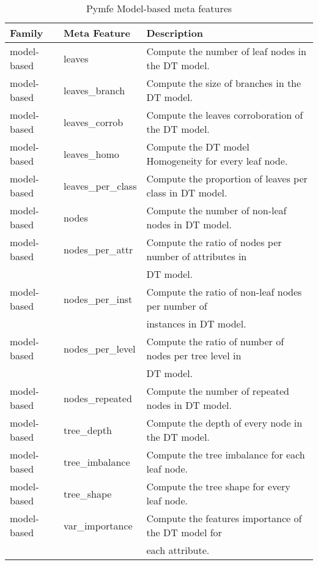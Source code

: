 \begin{table}[h!]
  \centering
  \caption{Pymfe Model-based meta features}
  \setlength{\tabcolsep}{8pt}
    \renewcommand{\arraystretch}{1.2}
      \begin{tabular}{lll}
        \hline
      Family & Meta Feature & Description \\
      \hline
      model-based & leaves & Compute the number of leaf nodes in the DT model.\\
      model-based & leaves\_branch & Compute the size of branches in the DT model.\\
      model-based & leaves\_corrob & Compute the leaves corroboration of the DT model.\\
      model-based & leaves\_homo & Compute the DT model Homogeneity for every leaf node.\\
      model-based & leaves\_per\_class & Compute the proportion of leaves per class in DT model.\\
      model-based & nodes & Compute the number of non-leaf nodes in DT model.\\
      model-based & nodes\_per\_attr & Compute the ratio of nodes per number of attributes in\\ & & DT model.\\
      model-based & nodes\_per\_inst & Compute the ratio of non-leaf nodes per number of \\ & & instances in DT model.\\
      model-based & nodes\_per\_level & Compute the ratio of number of nodes per tree level in\\ & & DT model.\\
      model-based & nodes\_repeated & Compute the number of repeated nodes in DT model.\\
      model-based & tree\_depth & Compute the depth of every node in the DT model.\\
      model-based & tree\_imbalance & Compute the tree imbalance for each leaf node.\\
      model-based & tree\_shape & Compute the tree shape for every leaf node.\\
      model-based & var\_importance & Compute the features importance of the DT model for\\ & & each attribute.\\\hline
  \end{tabular}
  \label{tab:pymfe-mb-mf}
\end{table}

